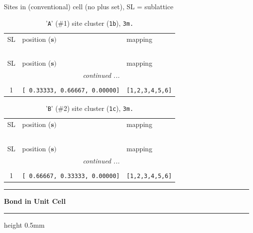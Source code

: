 \documentclass[fleqn,10pt,landscape]{jsarticle}
\begin{document}
\noindent Sites in (conventional) cell (no plus set), SL = sublattice

\renewcommand{\arraystretch}{1.6}
\begin{longtable}[l]{cll}
\captionsetup{justification=raggedright, singlelinecheck=off}
\caption{'\texttt{A}' (\#1) site cluster (\texttt{1b}), \texttt{3m.}}
 \\
 \hline \hline
SL & position ($\bm{s})$ & mapping \\ \hline \endfirsthead

\multicolumn{2}{l}{\tablename\ \thetable{}} \\
 \hline \hline
SL & position ($\bm{s})$ & mapping \\ \hline \endhead

 \hline \hline
\multicolumn{2}{r}{\footnotesize\it continued ...} \\ \endfoot

 \hline \hline
\multicolumn{2}{r}{} \\ \endlastfoot

1 & \texttt{[ 0.33333, 0.66667, 0.00000]} & \texttt{[1,2,3,4,5,6]} \\
\end{longtable}
\renewcommand{\arraystretch}{1.6}
\begin{longtable}[l]{cll}
\captionsetup{justification=raggedright, singlelinecheck=off}
\caption{'\texttt{B}' (\#2) site cluster (\texttt{1c}), \texttt{3m.}}
 \\
 \hline \hline
SL & position ($\bm{s})$ & mapping \\ \hline \endfirsthead

\multicolumn{2}{l}{\tablename\ \thetable{}} \\
 \hline \hline
SL & position ($\bm{s})$ & mapping \\ \hline \endhead

 \hline \hline
\multicolumn{2}{r}{\footnotesize\it continued ...} \\ \endfoot

 \hline \hline
\multicolumn{2}{r}{} \\ \endlastfoot

1 & \texttt{[ 0.66667, 0.33333, 0.00000]} & \texttt{[1,2,3,4,5,6]} \\
\end{longtable}
\vspace{5mm}
\noindent \rule[0.5mm]{5mm}{0.5mm}\hspace{3mm}\textbf{Bond in Unit Cell}\hspace{3mm}\leaders\hrule height 0.5mm\hfill\kern0pt
\vspace{3mm}
\end{document}
